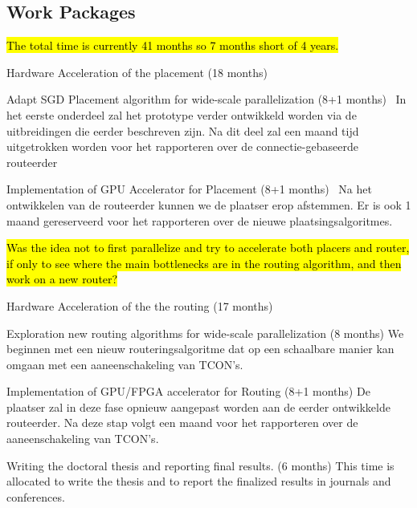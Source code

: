 \documentclass[a4paper,oneside,12pt]{article}
\begin{document}
\subsection{Work Packages}
\hl{The total time is currently 41 months so 7 months short of 4 years.}
\begin{description*}
\item[Hardware Acceleration of the placement (18 months)]\

\begin{description*}
\item[Adapt SGD Placement algorithm for wide-scale parallelization (8+1 months)]\
In het eerste onderdeel zal het prototype verder ontwikkeld worden via de uitbreidingen die eerder beschreven zijn. Na dit deel zal een maand tijd uitgetrokken worden voor het rapporteren over de connectie-gebaseerde routeerder
\item[Implementation of GPU Accelerator for Placement (8+1 months)]\
Na het ontwikkelen van de routeerder kunnen we de plaatser erop afstemmen. Er is ook 1 maand gereserveerd voor het rapporteren over de nieuwe plaatsingsalgoritmes.
\end{description*}

\hl{Was the idea not to first parallelize and try to accelerate both placers and router, if only to see where the main bottlenecks are in the routing algorithm, and then work on a new router?}

\item[Hardware Acceleration of the the routing (17 months)]\

\begin{description*}
\item[Exploration new routing algorithms for wide-scale parallelization (8 months)] 
We beginnen met een nieuw routeringsalgoritme dat op een schaalbare manier kan omgaan met een aaneenschakeling van TCON's.
\item[Implementation of GPU/FPGA accelerator for Routing (8+1 months)]
De plaatser zal in deze fase opnieuw aangepast worden aan de eerder ontwikkelde routeerder. Na deze stap volgt een maand voor het rapporteren over de aaneenschakeling van TCON's.
\end{description*}

\item[Writing the doctoral thesis and reporting final results. (6 months)] This time is allocated to write the thesis and to report the finalized results in journals and conferences.  

\end{description*}
\end{document}
